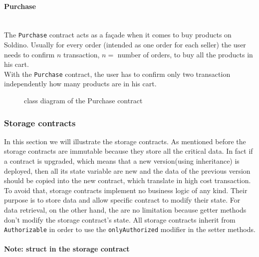 \paragraph{Purchase}\mbox{}\\ 

\noindent The \texttt{Purchase} contract acts as a façade when it comes to buy products on Soldino.
Usually for every order (intended as one order for each seller) the user needs to confirm $n$ transaction, $n =$ number of orders, to buy all the products in his cart.\\
With the \texttt{Purchase} contract, the user has to confirm only two transaction independently how many products are in his cart. 
\begin{figure}[H]
	\centering
	\caption{class diagram of the Purchase contract}
\end{figure}
\subsubsection{Storage contracts}
In this section we will illustrate the storage contracts. As mentioned before the storage contracts are immutable because they store all the critical data. In fact if a contract is upgraded, which means that a new version(using inheritance) is deployed, then all its state variable are new and the data of the previous version should be copied into the new contract, which translate in high cost transaction.\\
To avoid that, storage contracts implement no business logic of any kind. Their purpose is to store data and allow specific contract to modify their state. For data retrieval, on the other hand, the are no limitation because getter methods don't modify the storage contract's state.
All storage contracts inherit from \texttt{Authorizable} in order to use the \texttt{onlyAuthorized} modifier in the setter methods.
\paragraph*{Note: struct in the storage contract}


